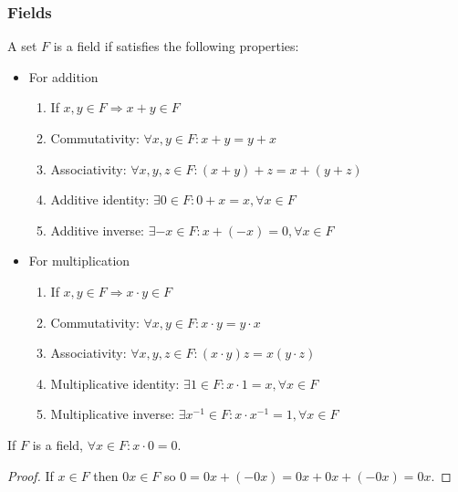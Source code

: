 \subsubsection{Fields}

\begin{definition}[Field]
    A set $F$ is a field if satisfies the following properties:
    \begin{itemize}
        \item For addition
            \begin{enumerate}
                \item If $x, y \in F \Rightarrow x + y \in F$
                \item Commutativity: $\forall x, y \in F: x + y = y + x$
                \item Associativity: $\forall x, y, z \in F: (x+y) + z = x + (y + z)$
                \item Additive identity: $\exists 0 \in F: 0 + x = x, \forall x \in F$
                \item Additive inverse: $\exists -x \in F: x + (-x) = 0, \forall x \in F$
            \end{enumerate}
        \item For multiplication
            \begin{enumerate}
                \item If $x, y \in F \Rightarrow x \cdot y \in F$
                \item Commutativity: $\forall x, y \in F: x \cdot y = y \cdot x$
                \item Associativity: $\forall x,y, z \in F: (x\cdot y) z = x (y \cdot z)$
                \item Multiplicative identity: $\exists 1 \in F: x \cdot 1 = x, \forall x \in F$
                \item Multiplicative inverse: $\exists x^{-1} \in F: x \cdot x^{-1} = 1, \forall x \in F$
            \end{enumerate}
    \end{itemize}
\end{definition}

\begin{theorem}
    If $F$ is a field, $\forall x \in F: x \cdot 0 = 0$.
\end{theorem}

\begin{proof}
    If $x \in F$ then $0x \in F$ so $0 = 0x + (-0x) = 0x + 0x + (-0x) = 0x$.
\end{proof}

